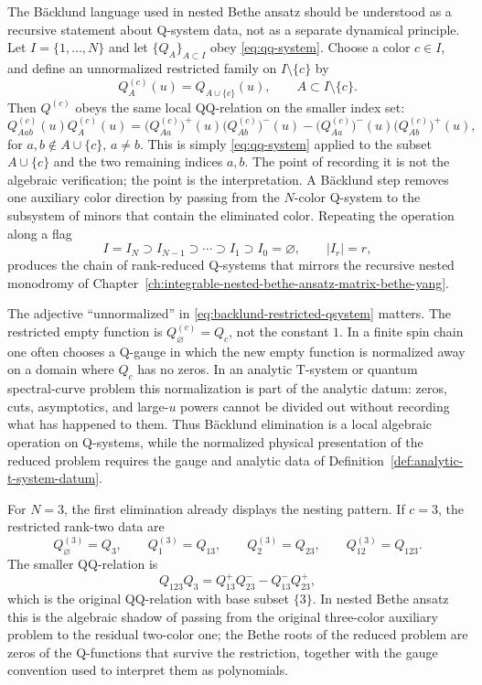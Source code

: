 The Bäcklund language used in nested Bethe ansatz should be understood as a
recursive statement about Q-system data, not as a separate dynamical
principle.  Let \(I=\{1,\ldots,N\}\) and let \(\{Q_A\}_{A\subset I}\) obey
\eqref{eq:qq-system}.  Choose a color \(c\in I\), and define an unnormalized
restricted family on \(I\setminus\{c\}\) by
\begin{equation}
  Q^{(c)}_A(u)=Q_{A\cup\{c\}}(u),
  \qquad A\subset I\setminus\{c\}.
  \label{eq:backlund-restricted-qsystem}
\end{equation}
Then \(Q^{(c)}\) obeys the same local QQ-relation on the smaller index set:
\begin{equation}
  Q^{(c)}_{Aab}(u)Q^{(c)}_A(u)
  =
  \bigl(Q^{(c)}_{Aa}\bigr)^{+}(u)
  \bigl(Q^{(c)}_{Ab}\bigr)^{-}(u)
  -
  \bigl(Q^{(c)}_{Aa}\bigr)^{-}(u)
  \bigl(Q^{(c)}_{Ab}\bigr)^{+}(u),
  \label{eq:backlund-restricted-qq-system}
\end{equation}
for \(a,b\notin A\cup\{c\}\), \(a\ne b\).  This is simply
\eqref{eq:qq-system} applied to the subset \(A\cup\{c\}\) and the two
remaining indices \(a,b\).  The point of recording it is not the algebraic
verification; the point is the interpretation.  A Bäcklund step removes one
auxiliary color direction by passing from the \(N\)-color Q-system to the
subsystem of minors that contain the eliminated color.  Repeating the
operation along a flag
\[
  I=I_N\supset I_{N-1}\supset\cdots\supset I_1\supset I_0=\varnothing,
  \qquad |I_r|=r,
\]
produces the chain of rank-reduced Q-systems that mirrors the recursive
nested monodromy of
Chapter~\ref{ch:integrable-nested-bethe-ansatz-matrix-bethe-yang}.

The adjective ``unnormalized'' in \eqref{eq:backlund-restricted-qsystem}
matters.  The restricted empty function is \(Q^{(c)}_\varnothing=Q_c\), not
the constant \(1\).  In a finite spin chain one often chooses a Q-gauge in
which the new empty function is normalized away on a domain where \(Q_c\) has
no zeros.  In an analytic T-system or quantum spectral-curve problem this
normalization is part of the analytic datum: zeros, cuts, asymptotics, and
large-\(u\) powers cannot be divided out without recording what has happened
to them.  Thus Bäcklund elimination is a local algebraic operation on
Q-systems, while the normalized physical presentation of the reduced problem
requires the gauge and analytic data of
Definition~\ref{def:analytic-t-system-datum}.

For \(N=3\), the first elimination already displays the nesting pattern.  If
\(c=3\), the restricted rank-two data are
\[
  Q^{(3)}_\varnothing=Q_3,\qquad
  Q^{(3)}_1=Q_{13},\qquad
  Q^{(3)}_2=Q_{23},\qquad
  Q^{(3)}_{12}=Q_{123}.
\]
The smaller QQ-relation is
\[
  Q_{123}Q_3=Q_{13}^{+}Q_{23}^{-}-Q_{13}^{-}Q_{23}^{+},
\]
which is the original QQ-relation with base subset \(\{3\}\).  In nested
Bethe ansatz this is the algebraic shadow of passing from the original
three-color auxiliary problem to the residual two-color one; the Bethe roots
of the reduced problem are zeros of the Q-functions that survive the
restriction, together with the gauge convention used to interpret them as
polynomials.


